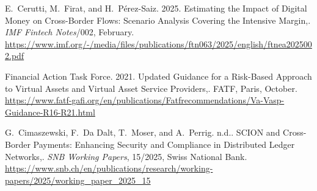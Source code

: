{\begin{enumerate}[label={[\arabic*]}]
\item E.~Cerutti, M.~Firat, and H.~P\'{e}rez-Saiz. 2025. Estimating the Impact of Digital Money on Cross-Border Flows: Scenario Analysis Covering the Intensive Margin,. \emph{IMF Fintech Notes}/002, February. \url{https://www.imf.org/-/media/files/publications/ftn063/2025/english/ftnea2025002.pdf}

\item Financial Action Task Force. 2021. Updated Guidance for a Risk-Based Approach to Virtual Assets and Virtual Asset Service Providers,. FATF, Paris, October. \url{https://www.fatf-gafi.org/en/publications/Fatfrecommendations/Va-Vasp-Guidance-R16-R21.html}

\item G.~Cimaszewski, F.~Da Dalt, T.~Moser, and A.~Perrig. n.d.. SCION and Cross-Border Payments: Enhancing Security and Compliance in Distributed Ledger Networks,. \emph{SNB Working Papers}, 15/2025, Swiss National Bank. \url{https://www.snb.ch/en/publications/research/working-papers/2025/working_paper_2025_15}

\end{enumerate}
}